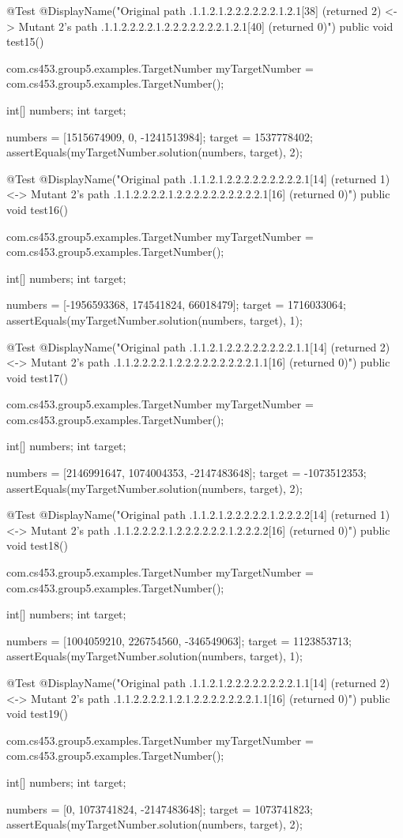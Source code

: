 @Test
@DisplayName("Original path .1.1.2.1.2.2.2.2.2.2.1.2.1[38] (returned 2) <-> Mutant 2's path .1.1.2.2.2.2.1.2.2.2.2.2.2.2.1.2.1[40] (returned 0)")
public void test15() {
    com.cs453.group5.examples.TargetNumber myTargetNumber = com.cs453.group5.examples.TargetNumber();

    int[] numbers;
    int target;

    numbers = [1515674909, 0, -1241513984];
    target = 1537778402;
    assertEquals(myTargetNumber.solution(numbers, target), 2);
}

@Test
@DisplayName("Original path .1.1.2.1.2.2.2.2.2.2.2.2.2.1[14] (returned 1) <-> Mutant 2's path .1.1.2.2.2.2.1.2.2.2.2.2.2.2.2.2.2.1[16] (returned 0)")
public void test16() {
    com.cs453.group5.examples.TargetNumber myTargetNumber = com.cs453.group5.examples.TargetNumber();

    int[] numbers;
    int target;

    numbers = [-1956593368, 174541824, 66018479];
    target = 1716033064;
    assertEquals(myTargetNumber.solution(numbers, target), 1);
}

@Test
@DisplayName("Original path .1.1.2.1.2.2.2.2.2.2.2.2.1.1[14] (returned 2) <-> Mutant 2's path .1.1.2.2.2.2.1.2.2.2.2.2.2.2.2.2.1.1[16] (returned 0)")
public void test17() {
    com.cs453.group5.examples.TargetNumber myTargetNumber = com.cs453.group5.examples.TargetNumber();

    int[] numbers;
    int target;

    numbers = [2146991647, 1074004353, -2147483648];
    target = -1073512353;
    assertEquals(myTargetNumber.solution(numbers, target), 2);
}

@Test
@DisplayName("Original path .1.1.2.1.2.2.2.2.2.1.2.2.2.2[14] (returned 1) <-> Mutant 2's path .1.1.2.2.2.2.1.2.2.2.2.2.2.1.2.2.2.2[16] (returned 0)")
public void test18() {
    com.cs453.group5.examples.TargetNumber myTargetNumber = com.cs453.group5.examples.TargetNumber();

    int[] numbers;
    int target;

    numbers = [1004059210, 226754560, -346549063];
    target = 1123853713;
    assertEquals(myTargetNumber.solution(numbers, target), 1);
}

@Test
@DisplayName("Original path .1.1.2.1.2.2.2.2.2.2.2.2.1.1[14] (returned 2) <-> Mutant 2's path .1.1.2.2.2.2.1.2.1.2.2.2.2.2.2.2.1.1[16] (returned 0)")
public void test19() {
    com.cs453.group5.examples.TargetNumber myTargetNumber = com.cs453.group5.examples.TargetNumber();

    int[] numbers;
    int target;

    numbers = [0, 1073741824, -2147483648];
    target = 1073741823;
    assertEquals(myTargetNumber.solution(numbers, target), 2);
}

